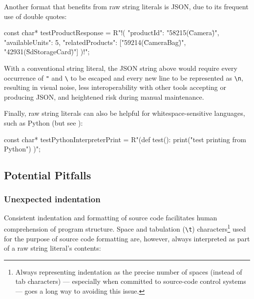 \noindent Another format that benefits from raw string literals is JSON, due to
its frequent use of double quotes:

\begin{emcppslisting}[language=C++]
const char* testProductResponse = R"!(
{
    "productId": "58215(\"Camera\")",
    "availableUnits": 5,
    "relatedProducts": ["59214(\"CameraBag\")", "42931(\"SdStorageCard\")"]
})!";
\end{emcppslisting}
    
\noindent With a conventional string literal, the JSON string above would require
every occurrence of \lstinline!"! and \lstinline!\! to be escaped
and every new line to be represented as \lstinline!\n!, resulting
in visual noise, less interoperability with other tools accepting or
producing JSON, and heightened risk during manual maintenance.

Finally, raw string literals can also be helpful for
whitespace-sensitive languages, such as Python (but see ): 

\begin{emcppslisting}[language=C++]
const char* testPythonInterpreterPrint = R"(def test():
    print("test printing from Python")
)";
\end{emcppslisting}
    

\subsection[Potential Pitfalls]{Potential Pitfalls}\label{potential-pitfalls-rawstringliteral}

\subsubsection[Unexpected indentation]{Unexpected indentation}\label{unexpected-indentation}

Consistent indentation and formatting of source code facilitates human
comprehension of program structure. Space and tabulation
(\lstinline!\t!) characters{\cprotect\footnote{Always
representing indentation as the precise number of spaces (instead of
tab characters) --- especially when committed to source-code control
  systems --- goes a long way to avoiding this issue.}} used for the
purpose of source code formatting are, however, always interpreted as
part of a raw string literal's contents:

